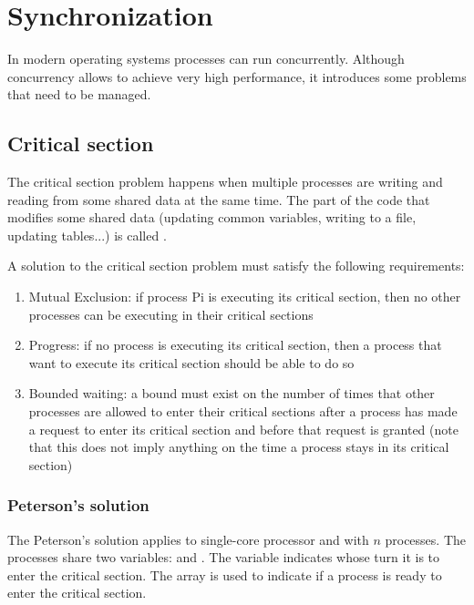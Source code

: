 \chapter{Synchronization}

In modern operating systems processes can run concurrently. Although concurrency allows to achieve very high performance, it introduces some problems that need to be managed.

\section{Critical section}
The critical section problem happens when multiple processes are writing and reading from some shared data at the same time. The part of the code that modifies some shared data (updating common variables, writing to a file, updating tables...) is called .

A solution to the critical section problem must satisfy the following requirements:
\begin{enumerate}
    \item Mutual Exclusion: if process Pi is executing its critical section, then no other processes can be executing in their critical sections
    \item Progress: if no process is executing its critical section, then a process that want to execute its critical section should be able to do so
    \item Bounded waiting: a bound must exist on the number of times that other processes are allowed to enter their critical sections after a process has made a request to enter its critical section and before that request is granted (note that this does not imply anything on the time a process stays in its critical section)
\end{enumerate}

\subsection{Peterson's solution}
The Peterson's solution applies to single-core processor and with $n$ processes. The processes share two variables:  and . The  variable indicates whose turn it is to enter the critical section. The  array is used to indicate if a process is ready to enter the critical section.



